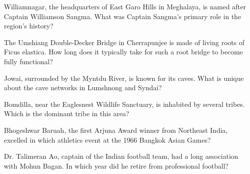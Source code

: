 \documentclass[12pt,a4paper]{book}
\begin{document}
\begin{enhancedmcq}[Question 13]{Williamnagar, the headquarters of East Garo Hills in Meghalaya, is named after Captain Williamson Sangma. What was Captain Sangma's primary role in the region's history?}
\end{enhancedmcq}

\begin{enhancedmcq}[Question 14]{The Umshiang Double-Decker Bridge in Cherrapunjee is made of living roots of Ficus elastica. How long does it typically take for such a root bridge to become fully functional?}
\end{enhancedmcq}

\begin{enhancedmcq}[Question 15]{Jowai, surrounded by the Myntdu River, is known for its caves. What is unique about the cave networks in Lumshnong and Syndai?}
\end{enhancedmcq}

\begin{enhancedmcq}[Question 16]{Bomdilla, near the Eaglesnest Wildlife Sanctuary, is inhabited by several tribes. Which is the dominant tribe in this area?}
\end{enhancedmcq}

\begin{enhancedmcq}[Question 17]{Bhogeshwar Baruah, the first Arjuna Award winner from Northeast India, excelled in which athletics event at the 1966 Bangkok Asian Games?}
\end{enhancedmcq}

\begin{enhancedmcq}[Question 18]{Dr. Talimeran Ao, captain of the Indian football team, had a long association with Mohun Bagan. In which year did he retire from professional football?}
\end{enhancedmcq}
\end{document}
